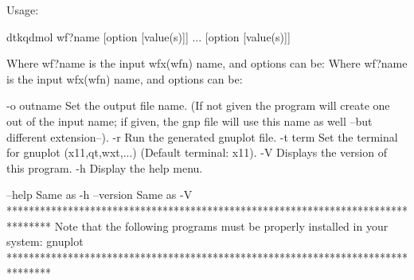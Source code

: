 

Usage:

	dtkqdmol wf?name [option [value(s)]] ... [option [value(s)]]

Where wf?name is the input wfx(wfn) name, and options can be:
Where wf?name is the input wfx(wfn) name, and options can be:

  -o outname	Set the output file name.
            	  (If not given the program will create one out of
            	  the input name; if given, the gnp file will
            	  use this name as well --but different extension--).
  -r        	Run the generated gnuplot file.
  -t term   	Set the terminal for gnuplot (x11,qt,wxt,...)
            	  (Default terminal: x11).
  -V        	Displays the version of this program.
  -h        	Display the help menu.

  --help    		Same as -h
  --version 		Same as -V
********************************************************************************
  Note that the following programs must be properly installed in your system:
                                    gnuplot
********************************************************************************
